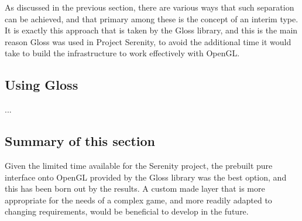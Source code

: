 As discussed in the previous section, there are various ways that such separation can be achieved, and that primary among these is the concept of an interim type. It is exactly this approach that is taken by the Gloss library, and this is the main reason Gloss was used in Project Serenity, to avoid the additional time it would take to build the infrastructure to work effectively with OpenGL.

\subsection{Using Gloss}

...

\subsection{Summary of this section} 
Given the limited time available for the Serenity project, the prebuilt pure interface onto OpenGL provided by the Gloss library was the best option, and this has been born out by the results. A custom made layer that is more appropriate for the needs of a complex game, and more readily adapted to changing requirements, would be beneficial to develop in the future.
